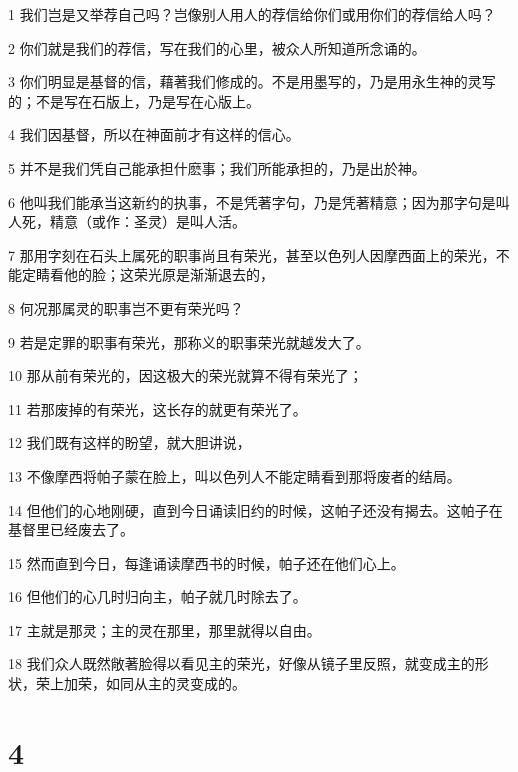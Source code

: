 \par 1 我们岂是又举荐自己吗？岂像别人用人的荐信给你们或用你们的荐信给人吗？
\par 2 你们就是我们的荐信，写在我们的心里，被众人所知道所念诵的。
\par 3 你们明显是基督的信，藉著我们修成的。不是用墨写的，乃是用永生神的灵写的；不是写在石版上，乃是写在心版上。
\par 4 我们因基督，所以在神面前才有这样的信心。
\par 5 并不是我们凭自己能承担什麽事；我们所能承担的，乃是出於神。
\par 6 他叫我们能承当这新约的执事，不是凭著字句，乃是凭著精意；因为那字句是叫人死，精意（或作：圣灵）是叫人活。
\par 7 那用字刻在石头上属死的职事尚且有荣光，甚至以色列人因摩西面上的荣光，不能定睛看他的脸；这荣光原是渐渐退去的，
\par 8 何况那属灵的职事岂不更有荣光吗？
\par 9 若是定罪的职事有荣光，那称义的职事荣光就越发大了。
\par 10 那从前有荣光的，因这极大的荣光就算不得有荣光了；
\par 11 若那废掉的有荣光，这长存的就更有荣光了。
\par 12 我们既有这样的盼望，就大胆讲说，
\par 13 不像摩西将帕子蒙在脸上，叫以色列人不能定睛看到那将废者的结局。
\par 14 但他们的心地刚硬，直到今日诵读旧约的时候，这帕子还没有揭去。这帕子在基督里已经废去了。
\par 15 然而直到今日，每逢诵读摩西书的时候，帕子还在他们心上。
\par 16 但他们的心几时归向主，帕子就几时除去了。
\par 17 主就是那灵；主的灵在那里，那里就得以自由。
\par 18 我们众人既然敞著脸得以看见主的荣光，好像从镜子里反照，就变成主的形状，荣上加荣，如同从主的灵变成的。

\chapter{4}

